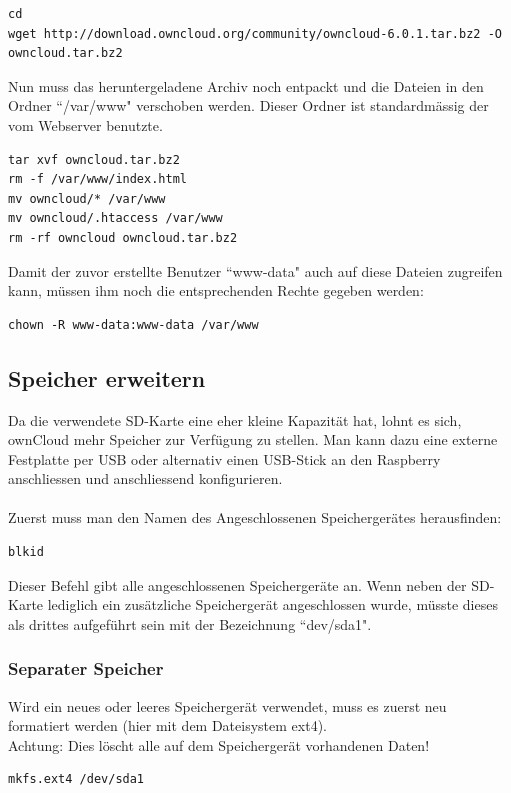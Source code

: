 \begin{lstlisting}
cd
wget http://download.owncloud.org/community/owncloud-6.0.1.tar.bz2 -O owncloud.tar.bz2
\end{lstlisting}

Nun muss das heruntergeladene Archiv noch entpackt und die Dateien in den Ordner ``/var/www" verschoben werden. Dieser Ordner ist standardmässig der vom Webserver benutzte.

\begin{lstlisting}
tar xvf owncloud.tar.bz2
rm -f /var/www/index.html
mv owncloud/* /var/www
mv owncloud/.htaccess /var/www
rm -rf owncloud owncloud.tar.bz2
\end{lstlisting}

Damit der zuvor erstellte Benutzer ``www-data" auch auf diese Dateien zugreifen kann, müssen ihm noch die entsprechenden Rechte gegeben werden:

\begin{lstlisting}
chown -R www-data:www-data /var/www
\end{lstlisting}

\subsection{Speicher erweitern}
Da die verwendete SD-Karte eine eher kleine Kapazität hat, lohnt es sich, ownCloud mehr Speicher zur Verfügung zu stellen. Man kann dazu eine externe Festplatte per USB oder alternativ einen USB-Stick an den Raspberry anschliessen und anschliessend konfigurieren.
\\
\\
Zuerst muss man den Namen des Angeschlossenen Speichergerätes herausfinden: 

\begin{lstlisting}
blkid
\end{lstlisting}

Dieser Befehl gibt alle angeschlossenen Speichergeräte an. Wenn neben der SD-Karte lediglich ein zusätzliche Speichergerät angeschlossen wurde, müsste dieses als drittes aufgeführt sein mit der Bezeichnung ``dev/sda1".

\subsubsection{Separater Speicher}
Wird ein neues oder leeres Speichergerät verwendet, muss es zuerst neu formatiert werden (hier mit dem Dateisystem ext4).
\\Achtung: Dies löscht alle auf dem Speichergerät vorhandenen Daten!
\\
\begin{lstlisting}
mkfs.ext4 /dev/sda1
\end{lstlisting}

